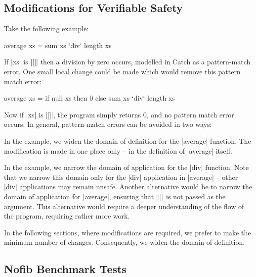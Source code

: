 \subsection{Modifications for Verifiable Safety}
\label{secC:safety}

Take the following example:

\begin{code}
average xs = sum xs `div` length xs
\end{code}

If |xs| is |[]| then a division by zero occurs, modelled in Catch as a pattern-match error. One small local change could be made which would remove this pattern match error:

\begin{code}
average xs = if null xs then 0 else sum xs `div` length xs
\end{code}

\noindent Now if |xs| is |[]|, the program simply returns 0, and no pattern match error occurs. In general, pattern-match errors can be avoided in two ways:

 In the example, we widen the domain of definition for the |average| function. The modification is made in one place only -- in the definition of |average| itself.

 In the example, we narrow the domain of application for the |div| function.  Note that we narrow this domain only for the |div| application in |average| -- other |div| applications may remain unsafe. Another alternative would be to narrow the domain of application for |average|, ensuring that |[]| is not passed as the argument. This alternative would require a deeper understanding of the flow of the program, requiring rather more work.

In the following sections, where modifications are required, we prefer to make the minimum number of changes. Consequently, we widen the domain of definition.

\subsection{Nofib Benchmark Tests}
\label{secC:imaginary}

